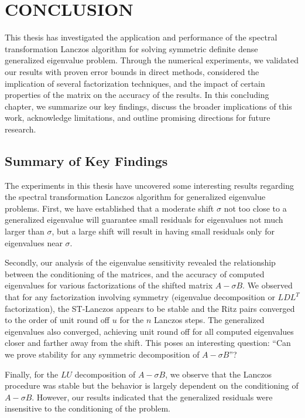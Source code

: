 \chapter{CONCLUSION}
This thesis has investigated the application and performance of the spectral transformation Lanczos algorithm for solving symmetric definite dense generalized eigenvalue problem. Through the numerical experiments, we validated our results with proven error bounds in direct methods, considered the implication of several factorization techniques, and the impact of certain properties of the matrix on the accuracy of the results. In this concluding chapter, we summarize our key findings, discuss the broader implications of this work, acknowledge limitations, and outline promising directions for future research.

\section{Summary of Key Findings}
The experiments in this thesis have uncovered some interesting results regarding the spectral transformation Lanczos algorithm for generalized eigenvalue problems. First, we have established that a moderate shift $\sigma$ not too close to a generalized eigenvalue will guarantee small residuals for eigenvalues not much larger than $\sigma$, but a large shift will result in having small residuals only for eigenvalues near $\sigma$.

Secondly, our analysis of the eigenvalue sensitivity revealed the relationship between the conditioning of the matrices, and the accuracy of computed eigenvalues for various factorizations of the shifted matrix $A-\sigma B$. We observed that for any factorization involving symmetry (eigenvalue decomposition or $LDL^T$ factorization), the ST-Lanczos appears to be stable and the Ritz pairs converged to the order of unit round off $u$ for the $n$ Lanczos steps. The generalized eigenvalues also converged, achieving unit round off for all computed eigenvalues closer and farther away from the shift. This poses an interesting question: ``Can we prove stability for any symmetric decomposition of $A - \sigma B$''?

Finally, for the $LU$ decomposition of $A - \sigma B$, we observe that the Lanczos procedure was stable but the behavior is largely dependent on the conditioning of $A-\sigma B$. However, our results indicated that the generalized residuals were insensitive to the conditioning of the problem.


